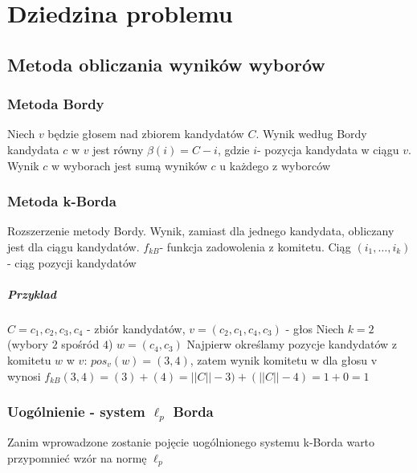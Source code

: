 \documentclass[pdflatex,11pt]{../aghdoc_version2}
\author{Tomasz Kasprzyk, Daniel Ogiela, Jakub Stępak}
\date{2016}
\begin{document}
\titlepages

\tableofcontents\thispagestyle{fancy}


\chapter{Dziedzina problemu}
\label{cha:dziedzina_problemu}

\section{Metoda obliczania wyników wyborów}
\label{sec:metoda_obliczania_wynikow_wyborow}

\subsection{Metoda Bordy}
\label{subsec:metoda_bordy}

Niech $v$ będzie głosem nad zbiorem kandydatów $C$. Wynik według Bordy kandydata $c$ w $v$ jest równy $\beta(i)=C-i$, gdzie $i$- pozycja kandydata w ciągu $v$.
Wynik $c$ w wyborach jest sumą wyników $c$ u każdego z wyborców


\subsection{Metoda k-Borda}
\label{subsec:metoda_k_borda}

Rozszerzenie metody Bordy. Wynik, zamiast dla jednego kandydata, obliczany jest dla ciągu kandydatów. $f_{kB}$- funkcja zadowolenia z komitetu. Ciąg $(i_1,\dots, i_k)$- ciąg pozycji kandydatów

\paragraph{Przyklad}
$C={c_1,c_2,c_3,c_4}$ - zbiór kandydatów, 
$v=(c_2,c_1,c_4,c_3)$ - głos
Niech $k = 2$ (wybory $2$ spośród $4$)
$w=(c_4,c_3)$
Najpierw określamy pozycje kandydatów z komitetu $w$ w $v$:
$pos_v(w)=(3,4)$, zatem wynik komitetu w dla głosu v wynosi
$f_{kB}(3,4) = (3) + (4) = ||C|| - 3 ) + ( ||C|| - 4 ) = 1 + 0 = 1$


\subsection{Uogólnienie - system $\ell_p$ Borda}
\label{subsec:system_ell_p_borda}

Zanim wprowadzone zostanie pojęcie uogólnionego systemu k-Borda warto przypomnieć wzór na normę $\ell_p$
\end{document}
